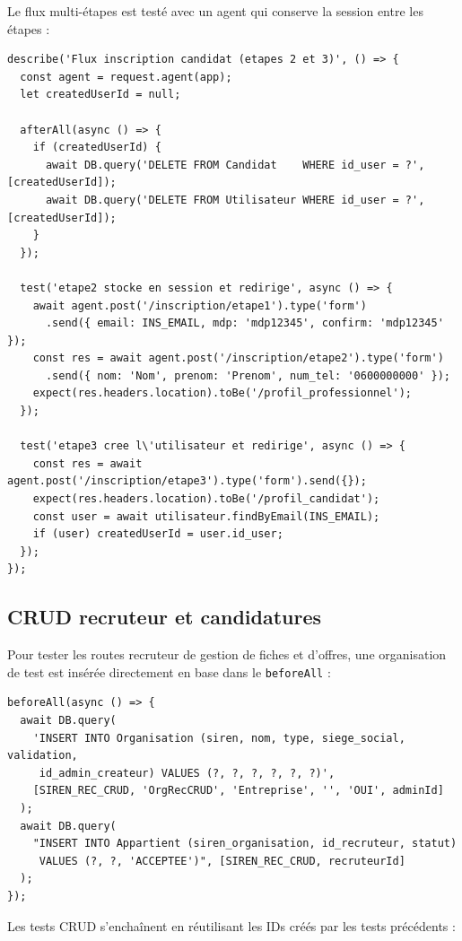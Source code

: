 \documentclass[12pt,a4paper]{article}
\begin{document}
Le flux multi-étapes est testé avec un agent qui conserve la session entre les étapes :

\begin{lstlisting}
describe('Flux inscription candidat (etapes 2 et 3)', () => {
  const agent = request.agent(app);
  let createdUserId = null;

  afterAll(async () => {
    if (createdUserId) {
      await DB.query('DELETE FROM Candidat    WHERE id_user = ?', [createdUserId]);
      await DB.query('DELETE FROM Utilisateur WHERE id_user = ?', [createdUserId]);
    }
  });

  test('etape2 stocke en session et redirige', async () => {
    await agent.post('/inscription/etape1').type('form')
      .send({ email: INS_EMAIL, mdp: 'mdp12345', confirm: 'mdp12345' });
    const res = await agent.post('/inscription/etape2').type('form')
      .send({ nom: 'Nom', prenom: 'Prenom', num_tel: '0600000000' });
    expect(res.headers.location).toBe('/profil_professionnel');
  });

  test('etape3 cree l\'utilisateur et redirige', async () => {
    const res = await agent.post('/inscription/etape3').type('form').send({});
    expect(res.headers.location).toBe('/profil_candidat');
    const user = await utilisateur.findByEmail(INS_EMAIL);
    if (user) createdUserId = user.id_user;
  });
});
\end{lstlisting}

\subsection{CRUD recruteur et candidatures}

Pour tester les routes recruteur de gestion de fiches et d'offres, une organisation de test est insérée directement en base dans le \texttt{beforeAll} :

\begin{lstlisting}
beforeAll(async () => {
  await DB.query(
    'INSERT INTO Organisation (siren, nom, type, siege_social, validation,
     id_admin_createur) VALUES (?, ?, ?, ?, ?, ?)',
    [SIREN_REC_CRUD, 'OrgRecCRUD', 'Entreprise', '', 'OUI', adminId]
  );
  await DB.query(
    "INSERT INTO Appartient (siren_organisation, id_recruteur, statut)
     VALUES (?, ?, 'ACCEPTEE')", [SIREN_REC_CRUD, recruteurId]
  );
});
\end{lstlisting}

Les tests CRUD s'enchaînent en réutilisant les IDs créés par les tests précédents :
\end{document}
